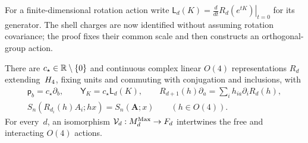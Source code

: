 \begin{samepage}
For a finite-dimensional rotation action write $\mathsf L_d(K)=\left.\frac{d}{dt}R_d(e^{tK})\right|_{t=0}$ for its generator. The shell charges are now identified without assuming rotation covariance; the proof fixes their common scale and then constructs an orthogonal-group action.
\begin{lemma}\label{lem:G3.1}
There are $c_\star\in\mathbb{R}\setminus\{0\}$ and continuous complex linear $O(4)$ representations $R_d$ extending~$H_4$, fixing units and commuting with conjugation and inclusions, with
\begin{gather*}
\mathsf p_b=c_\star\partial_b,\qquad
\mathsf Y_K=c_\star\mathsf L_d(K),\qquad
R_{d+1}(h)\partial_a=\sum_i h_{ia}\partial_iR_d(h),\\
S_n(R_{d_i}(h)A_i;hx)=S_n(\boldsymbol A;x)\qquad(h\in O(4)).
\end{gather*}
For every~$d$, an isomorphism $\mathcal V_d:M_{d}^{\mathrm{Max}}\to F_d$ intertwines the free and interacting $O(4)$ actions.
\end{lemma}
\end{samepage}
